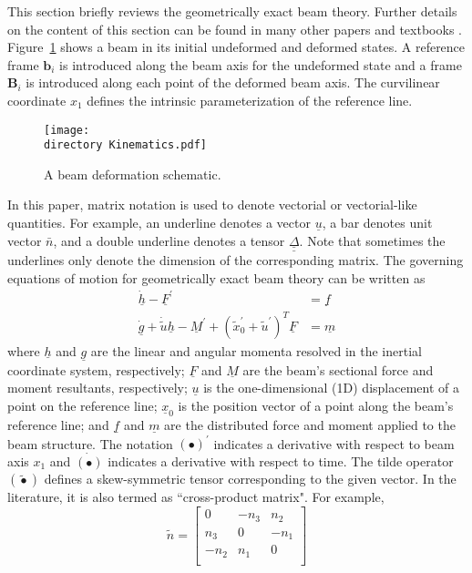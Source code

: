 \documentclass{aiaa-tc}
\def\directory{EPSF/}
\renewcommand{\vec}[1]{\underline{#1}}
\renewcommand{\skew}[1]{\widetilde{#1}}
\begin{document}
This section briefly reviews the geometrically exact beam theory. Further details on the content of this section can be found in many other papers and textbooks \cite{HodgesBeamBook,Bauchau:2010,YuGEBT}.
Figure~\ref{Kinematics} shows a beam in its initial undeformed
and deformed states. A reference frame $\mathbf{b}_i$ is introduced along the
beam axis for the undeformed state and a frame $\mathbf{B}_i$ is introduced
along each point of the deformed beam axis. The curvilinear coordinate $x_1$ defines the intrinsic parameterization of the reference line.
\begin{figure}
\centering
\texttt{[image: \\directory Kinematics.pdf]}
\caption{A beam deformation schematic.} \label{Kinematics}
\end{figure}
In this paper, matrix notation is used to denote vectorial or vectorial-like quantities. For example, an underline denotes a vector $\underline{u}$, a bar denotes unit vector $\bar{n}$, and a double underline denotes a tensor $\underline{\underline{\Delta}}$. Note that sometimes the underlines only denote the dimension of the corresponding matrix. The governing equations of motion for geometrically exact beam theory can be written as \cite{Bauchau:2010}
\begin{align}
	\label{GovernGEBT-1}
	\dot{\underline{h}} - \underline{F}^\prime &= \underline{f} \\
	\label{GovernGEBT-2}
	\dot{\underline{g}} + \dot{\tilde{u}} \underline{h} - \underline{M}^\prime + (\tilde{x}_0^\prime + \tilde{u}^\prime)^T \underline{F} &= \underline{m}
\end{align}
where $\vec{h}$ and $\vec{g}$ are the linear and angular momenta resolved in the inertial coordinate system, respectively; $\vec{F}$ and $\vec{M}$ are the beam's sectional force and moment resultants, respectively; $\vec{u}$ is the one-dimensional (1D) displacement of a point on the reference line; $\vec{x}_0$ is the position vector of a point along the beam's reference line;  and $\vec{f}$ and $\vec{m}$ are the distributed force and moment applied to the beam structure.  The notation $(\bullet)^\prime$ indicates a derivative with respect to beam axis $x_1$ and $\dot{(\bullet)}$ indicates a derivative with respect to time. The tilde operator $(\skew{\bullet})$ defines a skew-symmetric tensor corresponding to the given vector. In the literature, it is also termed as ``cross-product matrix". For example,
\[
	\skew{n} = 
	     		\begin{bmatrix}
			0 & -n_3 & n_2 \\
			n_3 & 0 & -n_1 \\
			-n_2 & n_1 & 0\\
			\end{bmatrix}	
\]
\end{document}
